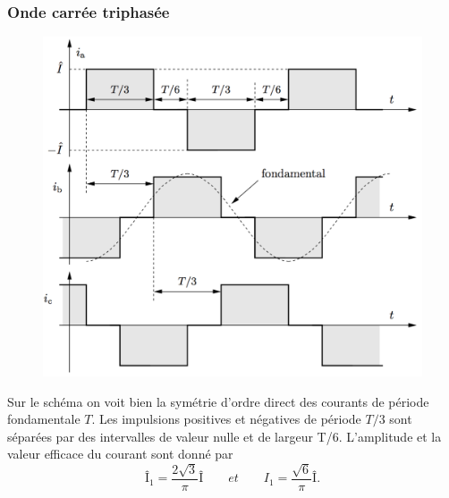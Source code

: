 		\subsubsection{Onde carrée triphasée}
			\begin{figure}
			\vspace{-5mm}
			\includegraphics[scale=0.25]{ch1/8}
			\end{figure}		
			Sur le schéma on voit bien la symétrie d'ordre direct des courants de période fondamentale $T$. Les impulsions positives et négatives de période $T/3$ sont séparées par des intervalles de valeur nulle et de largeur T/6. L'amplitude et la valeur efficace du courant sont donné par 
			\begin{equation}
				Î_{1} = \frac{2\sqrt{3}}{\pi} Î \qquad et \qquad I_1 = \frac{\sqrt{6}}{\pi} Î.
			\end{equation}